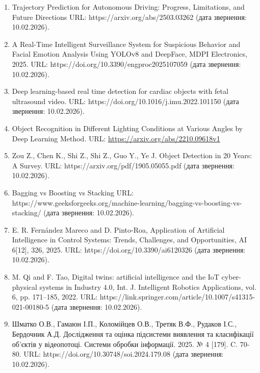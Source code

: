 \documentclass[
]{article}
\begin{document}
\begin{enumerate}
  \protect{}\label{_Ref221442860}{}Zamora-Ortiz, P., Carral-Alvaro, J., Valera, Á., Pulloquinga, J. L., Escarabajal, R. J., Mata, V. (2021). Identification of Inertial Parameters for Position and Force Control of Surgical Assistance Robots. Mathematics, 9{[}7{]}, 773. https://doi.org/10.3390/math9070773
\item
  \protect{}\label{_Ref221443649}{}Trajectory Prediction for Autonomous Driving: Progress, Limitations, and Future Directions URL: https://arxiv.org/abs/2503.03262 (дата звернення: 10.02.2026).
\item
  \protect{}\label{_Ref221443786}{}A Real‑Time Intelligent Surveillance System for Suspicious Behavior and Facial Emotion Analysis Using YOLOv8 and DeepFace, MDPI Electronics, 2025. URL: https://doi.org/10.3390/engproc2025107059 (дата звернення: 10.02.2026).
\item
  \protect{}\label{_Ref221444338}{}Deep learning-based real time detection for cardiac objects with fetal ultrasound video. URL: https://doi.org/10.1016/j.imu.2022.101150 (дата звернення: 10.02.2026).
\item
  \protect{}\label{_Ref221549463}{}Object Recognition in Different Lighting Conditions at Various Angles by Deep Learning Method. URL: \url{https://arxiv.org/abs/2210.09618v1}
\item
  \protect{}\label{_Ref221549586}{}Zou Z., Chen K., Shi Z., Shi Z., Guo Y., Ye J. Object Detection in 20 Years: A Survey. URL: https://arxiv.org/pdf/1905.05055.pdf (дата звернення: 10.02.2026).
\item
  \protect{}\label{_Ref221549767}{}Bagging vs Boosting vs Stacking URL: https://www.geeksforgeeks.org/machine-learning/bagging-vs-boosting-vs-stacking/ (дата звернення: 10.02.2026).
\item
  \protect{}\label{_Ref221549991}{}E. R. Fernández Mareco and D. Pinto-Roa, Application of Artificial Intelligence in Control Systems: Trends, Challenges, and Opportunities, AI 6{[}12{]}, 326, 2025. URL: https://doi.org/10.3390/ai6120326 (дата звернення: 10.02.2026).
\item
  M. Qi and F. Tao, Digital twins: artificial intelligence and the IoT cyber-physical systems in Industry 4.0, Int. J. Intelligent Robotics Applications, vol. 6, pp. 171--185, 2022. URL: https://link.springer.com/article/10.1007/s41315-021-00180-5 (дата звернення: 10.02.2026).
\item
  \protect{}\label{_Ref221550419}{}Шматко О.В., Гамаюн І.П., Коломійцев О.В., Третяк В.Ф., Рудаков І.С., Бердочник А.Д. Дослідження та оцінка підсистеми виявлення та класифікації об'єктів у відеопотоці. Системи обробки інформації. 2025. № 4 {[}179{]}. C. 70-80. URL: https://doi.org/10.30748/soi.2024.179.08 (дата звернення: 10.02.2026).

\end{enumerate}
\end{document}
